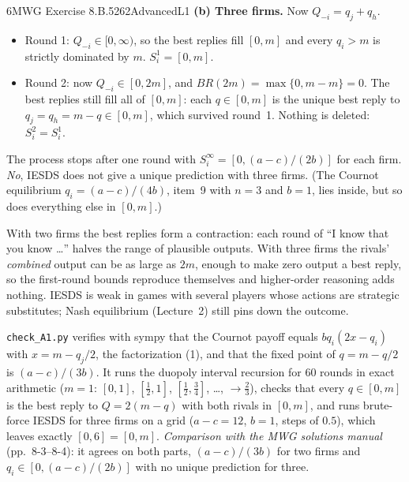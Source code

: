 \begin{exsol}{6}{MWG Exercise 8.B.5}{262}{Advanced}{L1}
\textbf{(b) Three firms.} Now $Q_{-i} = q_j + q_h$.
\begin{itemize}
  \item Round 1: $Q_{-i} \in [0, \infty)$, so the best replies fill $[0, m]$ and every $q_i > m$
  is strictly dominated by $m$. $S_i^1 = [0, m]$.
  \item Round 2: now $Q_{-i} \in [0, 2m]$, and $BR(2m) = \max\{0, m - m\} = 0$. The best replies
  still fill all of $[0, m]$: each $q \in [0, m]$ is the unique best reply to
  $q_j = q_h = m - q \in [0, m]$, which survived round~1. Nothing is deleted:
  $S_i^2 = S_i^1$.
\end{itemize}
The process stops after one round with $S_i^\infty = [0, (a-c)/(2b)]$ for each firm. \emph{No},
IESDS does not give a unique prediction with three firms. (The Cournot equilibrium
$q_i = (a-c)/(4b)$, item~9 with $n = 3$ and $b = 1$, lies inside, but so does everything else in $[0, m]$.)

\interp With two firms the best replies form a contraction: each round of ``I know that you
know \dots'' halves the range of plausible outputs. With three firms the rivals' \emph{combined}
output can be as large as $2m$, enough to make zero output a best reply, so the first-round
bounds reproduce themselves and higher-order reasoning adds nothing. IESDS is weak in games with
several players whose actions are strategic substitutes; Nash equilibrium (Lecture~2) still
pins down the outcome.

\verify \texttt{check\_A1.py} verifies with sympy that the Cournot payoff equals $b q_i(2x - q_i)$
with $x = m - q_j/2$, the factorization (1), and that the fixed point of $q = m - q/2$ is
$(a-c)/(3b)$. It runs the duopoly interval recursion for 60 rounds in exact arithmetic ($m = 1$:
$[0,1]$, $[\tfrac12, 1]$, $[\tfrac12, \tfrac34]$, \dots, $\to \tfrac23$), checks that every
$q \in [0, m]$ is the best reply to $Q = 2(m - q)$ with both rivals in $[0, m]$, and runs
brute-force IESDS for three firms on a grid ($a - c = 12$, $b = 1$, steps of $0.5$), which leaves
exactly $[0, 6] = [0, m]$. \emph{Comparison with the MWG solutions manual} (pp.~8-3--8-4): it
agrees on both parts, $(a-c)/(3b)$ for two firms and $q_i \in [0, (a-c)/(2b)]$ with no unique
prediction for three.

\end{exsol}
